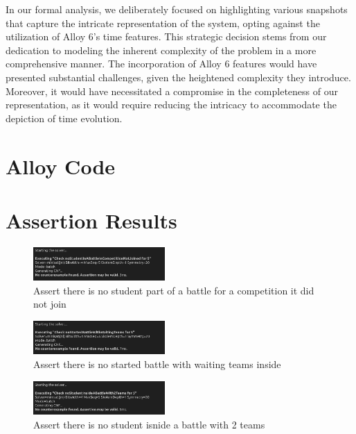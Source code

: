 In our formal analysis, we deliberately focused on highlighting various snapshots that capture the intricate representation of the system, opting against the utilization of Alloy 6's time features. This strategic decision stems from our dedication to modeling the inherent complexity of the problem in a more comprehensive manner. The incorporation of Alloy 6 features would have presented substantial challenges, given the heightened complexity they introduce. Moreover, it would have necessitated a compromise in the completeness of our representation, as it would require reducing the intricacy to accommodate the depiction of time evolution.

\section{Alloy Code}


\section{Assertion Results}

\begin{figure}[H]
    \centering
    \includegraphics[width=190px]{Images/alloy/assert_1.png}
    \caption{Assert there is no student part of a battle for a competition it did not join}
\end{figure}

\begin{figure}[H]
    \centering
    \includegraphics[width=190px]{Images/alloy/assert_2.png}
    \caption{Assert there is no started battle with waiting teams inside}
\end{figure}

\begin{figure}[H]
    \centering
    \includegraphics[width=190px]{Images/alloy/assert_3.png}
    \caption{Assert there is no student isnide a battle with 2 teams}
\end{figure}


